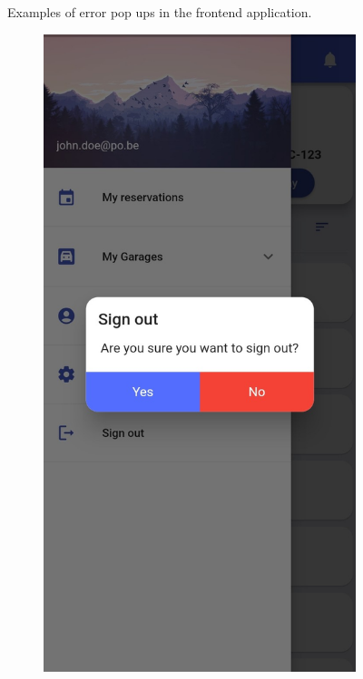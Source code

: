 \begin{appendices}
\begin{figure}[htp]
\begin{subfigure}[b]{0.30\textwidth}
     \end{subfigure}
        \caption{Examples of error pop ups in the frontend application.}
        \label{fig:error-dialogs}
\end{figure}
\begin{figure}[!htp]
     \centering
     \begin{subfigure}[b]{0.30\textwidth}
         \centering
         \includegraphics[width=\textwidth]{images/dialog3.jpg}

\end{subfigure}
\end{figure}
\end{appendices}
